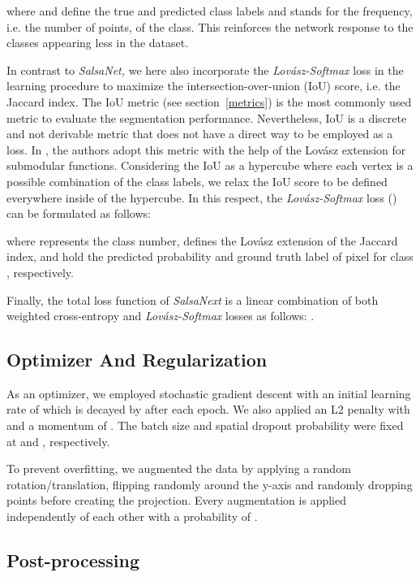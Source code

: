 \documentclass[letterpaper, 10 pt, conference]{ieeeconf}
\makeatletter
\newcommand{\snx}[1]{\textit{SalsaNext }{#1}}
\newcommand{\snk}[1]{\textit{SalsaNet, }{#1}}
\newcommand{\ls}[1]{\textit{Lov\'{a}sz-Softmax }{#1}}
\def\ie{i.e.\@\xspace}
\makeatother
\begin{document}
where  and  define the true and predicted class labels and  stands for the frequency, \ie the number of points, of the  class. 
This reinforces the network response to the  classes appearing less in the dataset.

In contrast to \snk we here also incorporate the \ls loss \cite{berman2018lovasz}   in the learning procedure to maximize the intersection-over-union (IoU) score, \ie the Jaccard
index.
The IoU metric (see section~\ref{metrics}) is the most commonly used metric to evaluate the segmentation performance. 
Nevertheless, IoU is a discrete and not derivable metric that does not have a direct way to be employed as a loss. In \cite{berman2018lovasz}, the authors adopt this metric with the help of the Lov\'{a}sz extension for submodular functions. 
Considering the IoU  as a hypercube where each vertex is a possible combination of the class labels, we relax the IoU score to be defined everywhere inside of the hypercube. In this respect, 
the \ls loss () can be formulated as follows:

 
where  represents the class number,  defines the Lov\'{a}sz extension of the Jaccard index,  and  hold the predicted probability and ground truth label of pixel  for class , respectively.


Finally, the total loss function of \snx is a linear combination of both weighted cross-entropy and \ls losses
as follows:
.



 
 

\subsection{Optimizer And Regularization}
As an optimizer, we employed stochastic gradient descent with an initial learning rate of  which is decayed by  after each epoch. 
We also applied an L2 penalty with  and a momentum of . 
The batch size and spatial dropout probability  were fixed at  and   , respectively.


To prevent overfitting, we augmented the data by applying a random rotation/translation, flipping randomly around the y-axis and randomly dropping points before creating the projection. Every augmentation is applied independently of each other with a probability of .
\subsection{Post-processing}
\label{sec:postproc}
\end{document}
